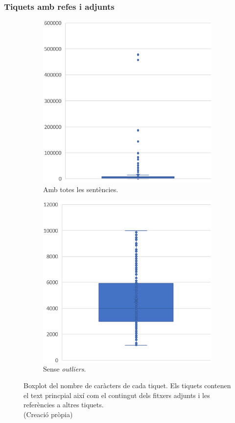 \subsubsection{Tiquets amb refes i adjunts}
\begin{figure}[H]
    \centering
    \begin{subfigure}{.5\textwidth}
      \centering
      \includegraphics[width=.7\linewidth]{boxplot_num_chars_adj_refs.png}
      \caption{Amb totes les sentències.}
      \label{fig:boxplot_num_chars_adj_refs}
    \end{subfigure}%
    \begin{subfigure}{.5\textwidth}
      \centering
      \includegraphics[width=.7\linewidth]{boxplot_num_chars_adj_refs_outliers.png}
      \caption{Sense \textit{outliers}.}
      \label{fig:boxplot_num_chars_adj_refs_outliers}
    \end{subfigure}
    \caption[Boxplot dels caràcters de cada tiquet amb adjunts i referències]{Boxplot del nombre de caràcters de cada tiquet. Els tiquets contenen el text princpial així com el contingut dels fitxers adjunts i les referències a altres tiquets. \\ (Creació pròpia)}
    \label{fig:boxplot_num_chars_adj_refs_dos}
\end{figure}

